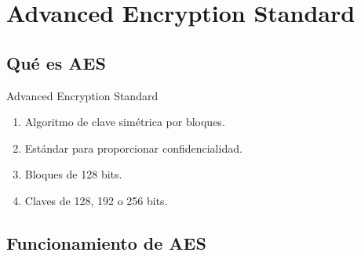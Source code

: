 \documentclass[10pt,t]{beamer}
\begin{document}
\begin{frame}
\end{frame}


\section{Advanced Encryption Standard}

\subsection{Qué es AES}

\begin{frame}
    \begin{block}{\centering \large Advanced Encryption Standard}
        \begin{enumerate}[label=--]
            \item Algoritmo de clave simétrica por bloques.\\
            \item Estándar para proporcionar confidencialidad.\\
            \item Bloques de 128 bits.\\
            \item Claves de 128, 192 o 256 bits.
        \end{enumerate}
    \end{block}
\end{frame}
    
\subsection{Funcionamiento de AES}
\end{document}
